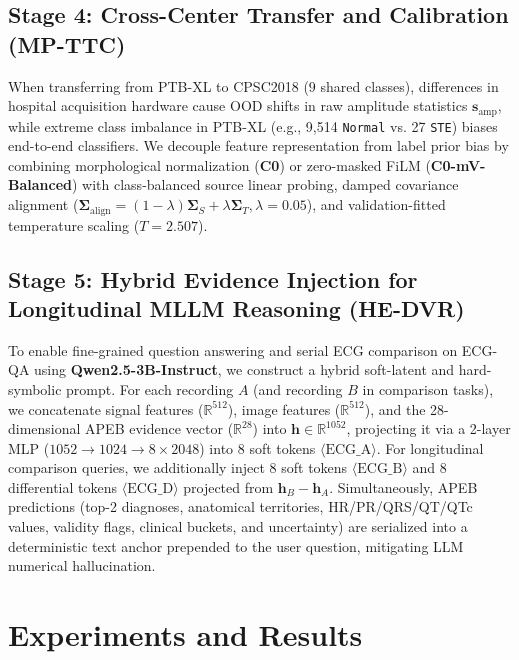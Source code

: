 \documentclass[preprint,12pt]{elsarticle}
\begin{document}
\subsection{Stage 4: Cross-Center Transfer and Calibration (MP-TTC)}
When transferring from PTB-XL to CPSC2018 ($9$ shared classes), differences in hospital acquisition hardware cause OOD shifts in raw amplitude statistics $\bm{s}_{\text{amp}}$, while extreme class imbalance in PTB-XL (e.g., 9,514 \texttt{Normal} vs. 27 \texttt{STE}) biases end-to-end classifiers. We decouple feature representation from label prior bias by combining morphological normalization (\textbf{C0}) or zero-masked FiLM (\textbf{C0-mV-Balanced}) with class-balanced source linear probing, damped covariance alignment ($\bm{\Sigma}_{\text{align}} = (1-\lambda)\bm{\Sigma}_S + \lambda\bm{\Sigma}_T, \lambda=0.05$), and validation-fitted temperature scaling ($T=2.507$).

\subsection{Stage 5: Hybrid Evidence Injection for Longitudinal MLLM Reasoning (HE-DVR)}
To enable fine-grained question answering and serial ECG comparison on ECG-QA using \textbf{Qwen2.5-3B-Instruct}, we construct a hybrid soft-latent and hard-symbolic prompt. For each recording $A$ (and recording $B$ in comparison tasks), we concatenate signal features ($\mathbb{R}^{512}$), image features ($\mathbb{R}^{512}$), and the 28-dimensional APEB evidence vector ($\mathbb{R}^{28}$) into $\bm{h} \in \mathbb{R}^{1052}$, projecting it via a 2-layer MLP ($1052 \to 1024 \to 8 \times 2048$) into 8 soft tokens $\langle\text{ECG\_A}\rangle$. For longitudinal comparison queries, we additionally inject 8 soft tokens $\langle\text{ECG\_B}\rangle$ and 8 differential tokens $\langle\text{ECG\_D}\rangle$ projected from $\bm{h}_B - \bm{h}_A$. Simultaneously, APEB predictions (top-2 diagnoses, anatomical territories, HR/PR/QRS/QT/QTc values, validity flags, clinical buckets, and uncertainty) are serialized into a deterministic text anchor prepended to the user question, mitigating LLM numerical hallucination.

\section{Experiments and Results}
\end{document}
